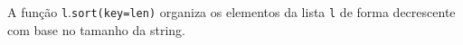 \documentclass[12pt,varwidth=16cm,border=1pt]{standalone}
\begin{document}
A função \verb+l+.\verb+sort(key=len)+ organiza os elementos da lista \verb+l+ de forma decrescente com base no tamanho da string.

\questiomfalse
\end{document}

